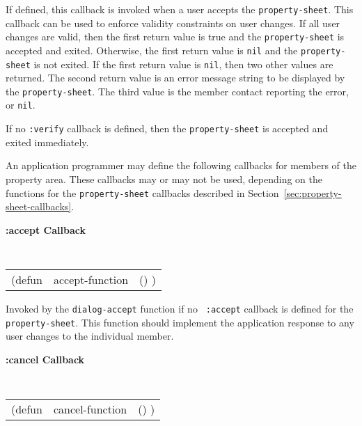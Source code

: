 \begin{flushright} \parbox[t]{6.125in}{ If defined, this callback is invoked
when a user accepts the {\tt property-sheet}.  This callback can be used to
enforce validity constraints on user changes.  If all user changes are valid,
then the first return value is true and the {\tt property-sheet} is accepted and
exited.  Otherwise, the first return value is {\tt nil} and the {\tt property-sheet} is
not exited. If the first return value is {\tt nil}, then two other values are
returned. The second return value is an error message string to be displayed by
the {\tt property-sheet}. The third value is the member contact reporting the error, or
{\tt nil}.
}\end{flushright}

\begin{flushright} \parbox[t]{6.125in}{ If no {\tt :verify} callback is defined,
then the {\tt property-sheet} is accepted and exited
immediately.}\end{flushright}

An application programmer may define the following callbacks for
members of the property area. 
These callbacks may or may not be used, depending on
the 
functions for the {\tt property-sheet} callbacks described in
Section~\ref{sec:property-sheet-callbacks}. 

{\samepage
{\large {\bf :accept \hfill Callback}} 
\begin{flushright} 
\parbox[t]{6.125in}{
\tt
\begin{tabular}{lll}
\raggedright
(defun & accept-function & () )
\end{tabular}
\rm

}\end{flushright}}

\begin{flushright} \parbox[t]{6.125in}{
Invoked by the {\tt dialog-accept} function if no {\tt
:accept} callback is defined for the {\tt property-sheet}.
This function should implement the application response to any user changes to
the individual member.
}\end{flushright}

{\samepage
{\large {\bf :cancel \hfill Callback}} 
\begin{flushright} 
\parbox[t]{6.125in}{
\tt
\begin{tabular}{lll}
\raggedright
(defun & cancel-function & () )
\end{tabular}
\rm

}\end{flushright}}


